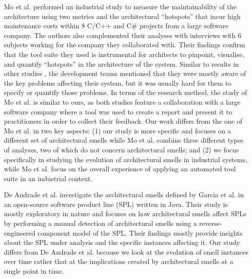 Mo et al. \cite{Mo2018} performed an industrial study to measure the maintainability of the architecture using two metrics and the architectural ``hotspots'' that incur high maintenance costs within 8 C/C++ and C\# projects from a large software company.
The authors also complemented their analyses with interviews with 6 subjects working for the company they collaborated with.
Their findings confirm that the tool suite they used is instrumental for architects to pinpoint, visualise, and quantify ``hotspots'' in the architecture of the system.
Similar to results in other studies \cite{Arcelli2020}, the development teams mentioned that they were mostly aware of the key problems affecting their system, but it was usually hard for them to specify or quantify those problems.
In terms of the research method, the study of Mo et al. is similar to ours, as both studies feature a collaboration with a large software company where a tool was used to create a report and present it to practitioners in order to collect their feedback.
Our work differs from the one of Mo et al. in two key aspects: (1) our study is more specific and focuses on a different set of architectural smells while Mo et al. combine three different types of analyses, two of which do not concern architectural smells; and (2) we focus specifically in studying the evolution of architectural smells in industrial systems, while Mo et al. focus on the overall experience of applying an automated tool suite in an industrial context.

De Andrade et al. \cite{DeAndrade2014} investigate the architectural smells defined by Garcia et al. \cite{Garcia2009} in an open-source software product line (SPL) written in Java.
Their study is mostly exploratory in nature and focuses on how architectural smells affect SPLs by performing a manual detection of architectural smells using a reverse-engineered component model of the SPL.
Their findings mostly provide insights about the SPL under analysis and the specific instances affecting it.
Our study differs from De Andrade et al. because we look at the evolution of smell instances over time rather that at the implications created by architectural smells at a single point in time.

